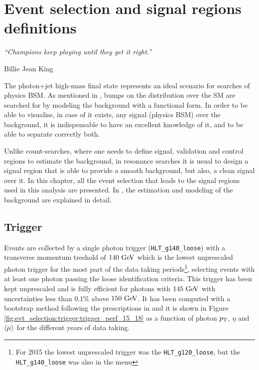 \chapter{Event selection and signal regions definitions}
\label{ch:evt_selection}
\epigraph{\emph{“Champions keep playing until they get it right.”}}{Billie Jean King}

The photon+jet high-mass final state represents an ideal scenario for searches of physics \ac{BSM}. As mentioned in \Ch{\ref{ch:strategy}}, bumps on the \myj distribution over the \ac{SM} are searched for by modeling the background with a functional form. In order to be able to visualise, in case of it exists, any signal (physics \ac{BSM}) over the background, it is indispensable to have an excellent knowledge of it, and to be able to separate correctly both.

Unlike count-searches, where one needs to define signal, validation and control regions to estimate the background, in resonance searches it is usual to design a signal region that is able to provide a smooth background, but also, a clean signal over it. In this chapter, all the event selection that leads to the signal regions used in this analysis are presented. In \Ch{\ref{ch:bkg}}, the estimation and modeling of the background are explained in detail.


\section{Trigger}
\label{sec:evt_selection:trigger}

Events are collected by a single photon trigger (\texttt{HLT\_g140\_loose}) with a transverse momentum treshold of \(140~\text{GeV}\) which is the lowest unprescaled photon trigger for the most part of the data taking periods\footnote{For 2015 the lowest unprescaled trigger was the \texttt{HLT\_g120\_loose}, but the \texttt{HLT\_g140\_loose} was also in the menu}, selecting events with at least one photon passing the loose identification criteria. This trigger has been kept unprescaled and is fully efficient for photons with \(145~\text{GeV}\) with uncertainties less than \(0.1\%\) above \(150~\text{GeV}\). It has been computed with a bootstrap method following the prescriptions in \cite{ATLAS-PhotonTrigger-Performance-2015} and it is shown in Figure \ref{fig:evt_selection:trigger:trigger_perf_15_18} as a function of photon \(p_{\text{T}}\), \(\eta\) and \(\langle \mu \rangle\) for the different years of data taking.

